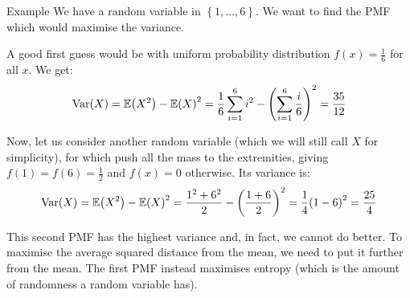 \documentclass[a4paper]{article}
\begin{document}
\begin{parag}{Example}
    We have a random variable in $\left\{1, \ldots, 6\right\}$. We want to find the PMF which would maximise the variance. 

    A good first guess would be with uniform probability distribution $f\left(x\right) = \frac{1}{6}$ for all $x$. We get: 
    \[\Var\left(X\right) = \exval\left(X^2\right) - \exval\left(X\right)^2 = \frac{1}{6} \sum_{i=1}^{6} i^2 - \left(\sum_{i=1}^{6} \frac{i}{6}\right)^2 = \frac{35}{12}\]

    Now, let us consider another random variable (which we will still call $X$ for simplicity), for which push all the mass to the extremities, giving $f\left(1\right) = f\left(6\right) = \frac{1}{2}$ and $f\left(x\right) = 0$ otherwise. Its variance is: 
    \[\Var\left(X\right) = \exval\left(X^2\right) - \exval\left(X\right)^2 = \frac{1^2 + 6^2}{2} - \left(\frac{1 + 6}{2}\right)^2 = \frac{1}{4} \left(1 - 6\right)^2 = \frac{25}{4}\]   

    This second PMF has the highest variance and, in fact, we cannot do better. To maximise the average squared distance from the mean, we need to put it further from the mean. The first PMF instead maximises entropy (which is the amount of randomness a random variable has).
\end{parag}
\end{document}
